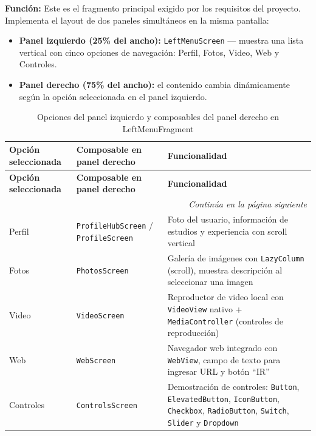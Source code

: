 \documentclass[stu, 12pt, letterpaper, donotrepeattitle, floatsintext, natbib]{apa7}
\begin{document}
\noindent\textbf{Función:} Este es el fragmento principal exigido por los requisitos del
proyecto. Implementa el layout de dos paneles simultáneos en la misma pantalla:

\begin{itemize}[nosep]
    \item \textbf{Panel izquierdo (25\% del ancho):} \texttt{LeftMenuScreen} --- muestra
    una lista vertical con cinco opciones de navegación: Perfil, Fotos, Video, Web y
    Controles.
    \item \textbf{Panel derecho (75\% del ancho):} el contenido cambia dinámicamente según
    la opción seleccionada en el panel izquierdo.
\end{itemize}

\begin{longtable}{@{}p{2.5cm}p{3.5cm}p{9.5cm}@{}}
\caption{Opciones del panel izquierdo y composables del panel derecho en LeftMenuFragment}
\label{tab:leftmenupaneles}\\
\toprule
\textbf{Opción seleccionada} & \textbf{Composable en panel derecho} &
\textbf{Funcionalidad} \\
\midrule
\endfirsthead
\toprule
\textbf{Opción seleccionada} & \textbf{Composable en panel derecho} &
\textbf{Funcionalidad} \\
\midrule
\endhead
\midrule
\multicolumn{3}{r}{\small\textit{Continúa en la página siguiente}}\\
\endfoot
\bottomrule
\endlastfoot
Perfil & \texttt{ProfileHubScreen} / \texttt{ProfileScreen} & Foto del usuario,
información de estudios y experiencia con scroll vertical \\[3pt]
Fotos & \texttt{PhotosScreen} & Galería de imágenes con \texttt{LazyColumn} (scroll),
muestra descripción al seleccionar una imagen \\[3pt]
Video & \texttt{VideoScreen} & Reproductor de video local con \texttt{VideoView} nativo
+ \texttt{MediaController} (controles de reproducción) \\[3pt]
Web & \texttt{WebScreen} & Navegador web integrado con \texttt{WebView}, campo de texto
para ingresar URL y botón ``IR'' \\[3pt]
Controles & \texttt{ControlsScreen} & Demostración de controles: \texttt{Button},
\texttt{ElevatedButton}, \texttt{IconButton}, \texttt{Checkbox}, \texttt{RadioButton},
\texttt{Switch}, \texttt{Slider} y \texttt{Dropdown} \\
\end{longtable}
\end{document}
